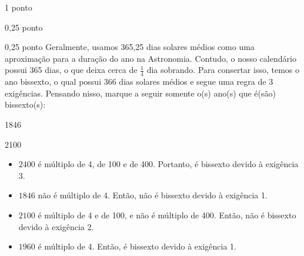 \documentclass{../lista}
\begin{document}
\begin{questao}{1 ponto}
\begin{pergunta}{0,25 ponto}
		\end{pergunta}
		
		\begin{pergunta}{0,25 ponto}
			Geralmente, usamos 365,25 dias solares médios como uma aproximação para a duração do ano na Astronomia. Contudo, o nosso calendário possui 365 dias, o que deixa cerca de $\frac{1}{4}$ dia sobrando. Para consertar isso, temos o ano bissexto, o qual possui 366 dias solares médios e segue uma regra de 3 exigências. Pensando nisso, marque a seguir somente o(s) ano(s) que é(são) bissexto(s):
			\begin{alternativas}
				\item 1846
				\item 2100
			\end{alternativas}

			\red
			{
				\begin{itemize}
					\item $2400$ é múltiplo de 4, de 100 e de 400. Portanto, é bissexto devido à exigência 3.
					\item $1846$ não é múltiplo de 4. Então, não é bissexto devido à exigência 1.
					\item $2100$ é múltiplo de 4 e de 100, e não é múltiplo de 400. Então, não é bissexto devido à exigência 2.
					\item $1960$ é múltiplo de 4. Então, é bissexto devido à exigência 1.
				\end{itemize}
			}
		\end{pergunta}
	\end{questao}
\end{document}
